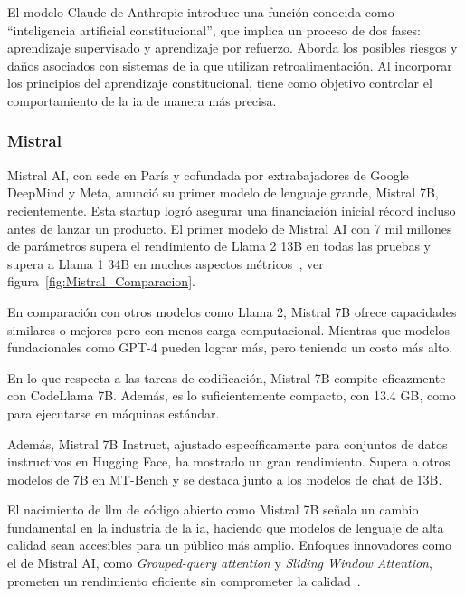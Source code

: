 El modelo Claude de Anthropic introduce una función conocida como ``inteligencia artificial constitucional'', que implica un proceso de dos fases: aprendizaje supervisado y aprendizaje por refuerzo. Aborda los posibles riesgos y daños asociados con sistemas de \acrlong{ia} que utilizan retroalimentación. Al incorporar los principios del aprendizaje constitucional, tiene como objetivo controlar el comportamiento de la \acrshort{ia} de manera más precisa.

\subsubsection{Mistral}

Mistral AI, con sede en París y cofundada por extrabajadores de Google DeepMind y Meta, anunció su primer modelo de lenguaje grande, Mistral 7B, recientemente. Esta startup logró asegurar una financiación inicial récord incluso antes de lanzar un producto. El primer modelo de Mistral AI con 7 mil millones de parámetros supera el rendimiento de Llama 2 13B en todas las pruebas y supera a Llama 1 34B en muchos aspectos métricos~\cite{Zhong2023AGIEvalAH}, ver figura~\ref{fig:Mistral_Comparacion}.


En comparación con otros modelos como Llama 2, Mistral 7B ofrece capacidades similares o mejores pero con menos carga computacional. Mientras que modelos fundacionales como GPT-4 pueden lograr más, pero teniendo un costo más alto.

En lo que respecta a las tareas de codificación, Mistral 7B compite eficazmente con CodeLlama 7B. Además, es lo suficientemente compacto, con 13.4 GB, como para ejecutarse en máquinas estándar.

Además, Mistral 7B Instruct, ajustado específicamente para conjuntos de datos instructivos en Hugging Face, ha mostrado un gran rendimiento. Supera a otros modelos de 7B en MT-Bench y se destaca junto a los modelos de chat de 13B.

El nacimiento de \acrlong{llm} de código abierto como Mistral 7B señala un cambio fundamental en la industria de la \acrlong{ia}, haciendo que modelos de lenguaje de alta calidad sean accesibles para un público más amplio. Enfoques innovadores como el de Mistral AI, como \textit{Grouped-query attention} y \textit{Sliding Window Attention}, prometen un rendimiento eficiente sin comprometer la calidad~\cite{MiitaMistral}.


